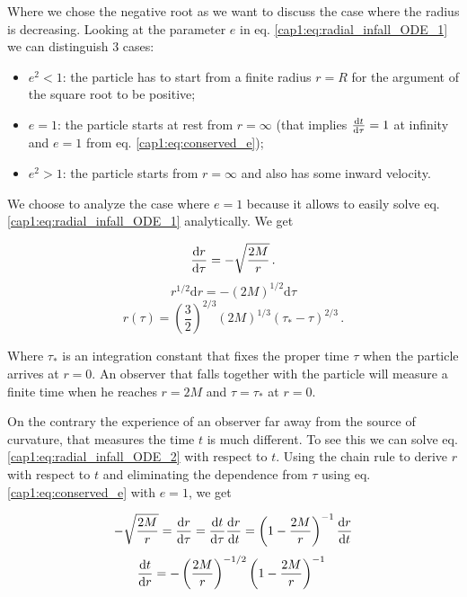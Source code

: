 Where we chose the negative root as we want to discuss the case where the radius
is decreasing.
Looking at the parameter $e$ in eq. \ref{cap1:eq:radial_infall_ODE_1} we can
distinguish 3 cases:

\begin{itemize}
    \item $e^2 < 1$: the particle has to start from a finite radius $r = R$
        for the argument of the square root to be positive;
    \item $e = 1$: the particle starts at rest from $r = \infty$ (that implies
        $\dv{t}{\tau} = 1$ at infinity and $e = 1$ from eq.
        \ref{cap1:eq:conserved_e});
    \item $e^2 > 1$: the particle starts from $r = \infty$ and also has some
        inward velocity.
\end{itemize}

We choose to analyze the case where $e = 1$ because it allows to easily solve
eq. \ref{cap1:eq:radial_infall_ODE_1} analytically.
We get

\begin{equation}
    \dv{r}{\tau} = - \sqrt{\frac{2 M}{r}} \, .
    \label{cap1:eq:radial_infall_ODE_2}
\end{equation}
\begin{equation*}
    r^{1/2} \mathrm{d}r = -(2M)^{1/2} \mathrm{d}\tau
\end{equation*}
\begin{equation}
    r(\tau) = \left(\frac{3}{2}\right)^{2/3}
    (2M)^{1/3} (\tau_* - \tau)^{2/3} \, .
    \label{cap1:eq:radial_infall_r_of_tau}
\end{equation}

Where $\tau_*$ is an integration constant that fixes the proper time $\tau$
when the particle arrives at $r = 0$.
An observer that falls together with the particle will measure a finite time
when he reaches $r = 2M$ and $\tau = \tau_*$ at $r = 0$.

On the contrary the experience of an observer far away from the source of
curvature, that measures the \Sh time $t$ is much different.
To see this we can solve eq. \ref{cap1:eq:radial_infall_ODE_2} with respect to
$t$.
Using the chain rule to derive $r$ with respect to $t$ and eliminating the
dependence from $\tau$ using eq. \ref{cap1:eq:conserved_e} with $e = 1$, we get

\begin{align*}
    - \sqrt{\frac{2 M}{r}} = \dv{r}{\tau} = \dv{t}{\tau} \dv{r}{t}
    = \left(1 - \frac{2M}{r} \right)^{-1} \dv{r}{t}
\end{align*}
\begin{equation*}
    \dv{t}{r} = - \left(\frac{2 M}{r}\right)^{-1/2}
    \left(1 - \frac{2M}{r} \right)^{-1} \,  \, 
\end{equation*}

